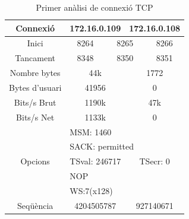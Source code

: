 \documentclass{article}
\begin{document}
\begin{table}[!h]
\centering
\begin{tabular}{c|cccccc}
Connexió &\multicolumn{3}{c}{172.16.0.109} &\multicolumn{3}{c}{172.16.0.108}\\
\hline
Inici &\multicolumn{2}{c}{8264} &\multicolumn{2}{c}{8265} &\multicolumn{2}{c}{8266}\\
\hline
Tancament &\multicolumn{2}{c}{8348} &\multicolumn{2}{c}{8350} 
&\multicolumn{2}{c}{8351}\\
\hline
Nombre bytes &\multicolumn{3}{c}{44k} &\multicolumn{3}{c}{1772}\\
\hline
Bytes d'usuari &\multicolumn{3}{c}{41956} &\multicolumn{3}{c}{0}\\
\hline
Bits/s Brut &\multicolumn{3}{c}{1190k} &\multicolumn{3}{c}{47k}\\
\hline
Bits/s Net &\multicolumn{3}{c}{1133k} &\multicolumn{3}{c}{0}\\
\hline
\multirow{5}{*}{Opcions} &\multicolumn{6}{l}{MSM: 1460} \\
&\multicolumn{6}{l}{SACK: permitted}\\
&\multicolumn{3}{c}{TSval: 246717}
&\multicolumn{3}{c}{TSecr: 0}\\
&\multicolumn{6}{l}{NOP}\\
&\multicolumn{6}{l}{WS:7(x128)}\\
\hline
Seqüència &\multicolumn{3}{c}{4204505787} &\multicolumn{3}{c}{927140671}\\

\end{tabular}
\caption{Primer anàlisi de connexió TCP}
\label{ana:fst}
\end{table}
\end{document}
